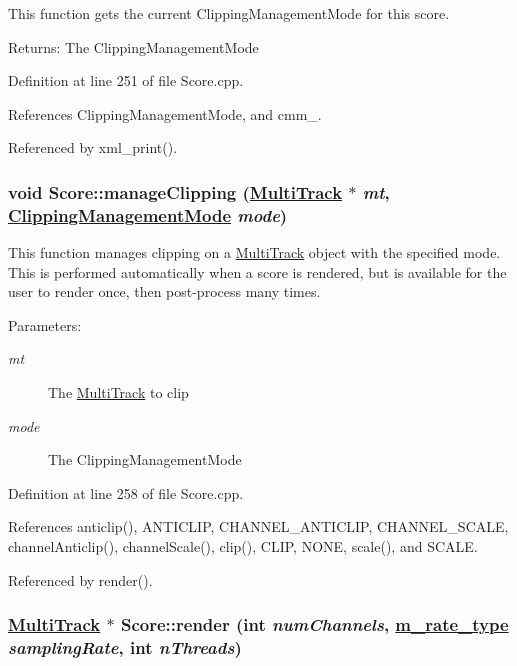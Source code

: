 This function gets the current Clipping\-Management\-Mode for this score. \begin{Desc}
\item[Returns:]The Clipping\-Management\-Mode \end{Desc}


Definition at line 251 of file Score.cpp.

References Clipping\-Management\-Mode, and cmm\_\-.

Referenced by xml\_\-print().\hypertarget{classScore_e0}{
\subsubsection[manageClipping]{\setlength{\rightskip}{0pt plus 5cm}void Score::manage\-Clipping (\hyperlink{classMultiTrack}{Multi\-Track} $\ast$ {\em mt}, \hyperlink{classScore_w6}{Clipping\-Management\-Mode} {\em mode})}}
\label{classScore_e0}


This function manages clipping on a \hyperlink{classMultiTrack}{Multi\-Track} object with the specified mode. This is performed automatically when a score is rendered, but is available for the user to render once, then post-process many times. \begin{Desc}
\item[Parameters:]
\begin{description}
\item[{\em mt}]The \hyperlink{classMultiTrack}{Multi\-Track} to clip \item[{\em mode}]The Clipping\-Management\-Mode \end{description}
\end{Desc}


Definition at line 258 of file Score.cpp.

References anticlip(), ANTICLIP, CHANNEL\_\-ANTICLIP, CHANNEL\_\-SCALE, channel\-Anticlip(), channel\-Scale(), clip(), CLIP, NONE, scale(), and SCALE.

Referenced by render().\hypertarget{classScore_a2}{
\subsubsection[render]{\setlength{\rightskip}{0pt plus 5cm}\hyperlink{classMultiTrack}{Multi\-Track} $\ast$ Score::render (int {\em num\-Channels}, \hyperlink{Types_8h_a4}{m\_\-rate\_\-type} {\em sampling\-Rate}, int {\em n\-Threads})}}
\label{classScore_a2}


